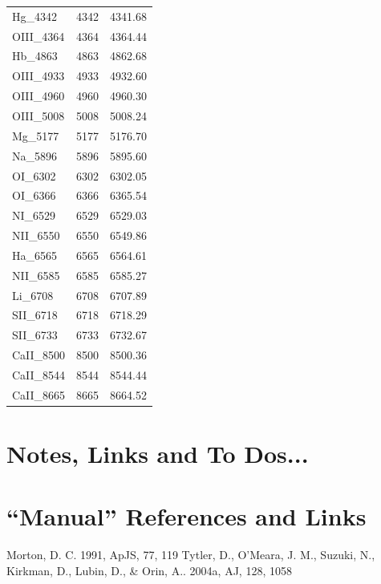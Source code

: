 \documentclass[11pt]{article}
\begin{document}
\begin{table}
\begin{center}
\begin{tabular}{lll}
Hg\_4342    &   4342 &	4341.68 \\
OIII\_4364  &	4364 &	4364.44 \\
Hb\_4863    &   4863 &  4862.68 \\
OIII\_4933  &	4933 &	4932.60 \\
OIII\_4960  &	4960 &  4960.30 \\
OIII\_5008  &	5008 &  5008.24 \\
Mg\_5177    &   5177 &	5176.70 \\
Na\_5896    &   5896 &	5895.60 \\
OI\_6302    &   6302 &	6302.05 \\
OI\_6366    &   6366 &	6365.54 \\
NI\_6529    &   6529 &	6529.03 \\
NII\_6550   &	6550 &	6549.86 \\
Ha\_6565    &   6565 &	6564.61 \\
NII\_6585   &	6585 &	6585.27 \\
Li\_6708    &   6708 &	6707.89 \\
SII\_6718   &	6718 &	6718.29 \\
SII\_6733   &	6733 &	6732.67 \\
CaII\_8500  &   8500 &	8500.36 \\
CaII\_8544  &	8544 &	8544.44 \\
CaII\_8665  &	8665 &	8664.52 \\
      \hline
      \hline
 \end{tabular}
   \end{center}
\end{table}


\section{Notes, Links and To Dos...}


\section{``Manual'' References and Links}
Morton, D. C. 1991, ApJS, 77, 119
Tytler, D., O’Meara, J. M., Suzuki, N., Kirkman, D., Lubin, D., \& Orin, A.. 2004a, AJ, 128, 1058



\end{document}
